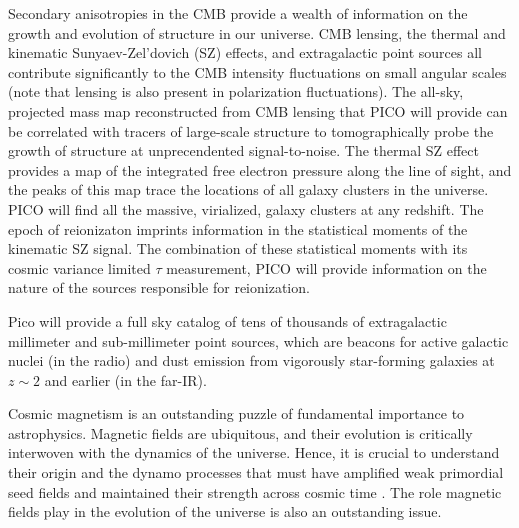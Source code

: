\documentclass[PICOReport.tex]{subfiles}
\begin{document}
  Secondary anisotropies in the CMB provide
a wealth of information on the growth and evolution of structure in our universe.
CMB lensing, the thermal and kinematic Sunyaev-Zel'dovich (SZ)
effects, and extragalactic point sources all contribute significantly
to the CMB intensity fluctuations on small angular scales (note that
lensing is also present in polarization fluctuations). The all-sky,
projected mass map reconstructed from CMB lensing that PICO will
provide can be correlated with tracers of large-scale structure to
tomographically probe the growth of structure at unprecendented
signal-to-noise. The thermal SZ effect provides a map of the
integrated free electron pressure along the line of sight, and the
peaks of this map trace the locations of all galaxy clusters in the
universe. PICO will find all the massive, virialized, galaxy clusters
at any redshift.  The epoch of reionizaton imprints information in the
statistical moments of the kinematic SZ signal.  The combination of
these statistical moments with its cosmic variance limited $\tau$
measurement, PICO will provide information on the nature of the
sources responsible for reionization.

Pico will provide a full sky catalog of tens of thousands of
extragalactic millimeter and sub-millimeter point sources, which are
beacons for active galactic nuclei (in the radio) and dust emission
from vigorously star-forming galaxies at $z \sim 2$ and earlier (in
the far-IR).

Cosmic magnetism is an outstanding puzzle of fundamental importance to astrophysics. Magnetic fields are ubiquitous, and their evolution is critically interwoven with the dynamics of the universe. Hence, it is crucial to understand
their origin and the dynamo processes that must have amplified weak  primordial seed fields 
and maintained their strength across cosmic time \citep{Brandenburg2005}. 
The role magnetic fields play in the evolution of the universe is also an outstanding issue. 
\end{document}

